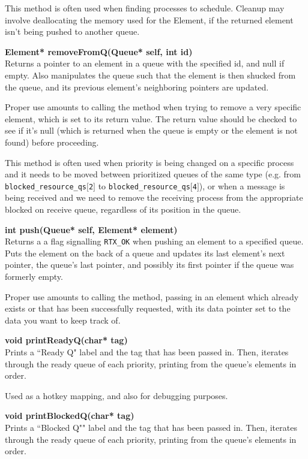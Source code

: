 \documentclass[11pt, oneside]{article}
\begin{document}
This method is often used when finding processes to schedule. Cleanup may involve deallocating the memory used for the Element, if the returned element isn't being pushed to another queue.

{\bf Element* removeFromQ(Queue* self, int id)}\\
Returns a pointer to an element in a queue with the specified id, and null if empty. Also manipulates the queue such that the element is then shucked from the queue, and its previous element's neighboring pointers are updated.

Proper use amounts to calling the method when trying to remove a very specific element, which is set to its return value. The return value should be checked to see if it's null (which is returned when the queue is empty or the element is not found) before proceeding.

This method is often used when priority is being changed on a specific process and it needs to be moved between prioritized queues of the same type (e.g. from {\tt blocked\_resource\_qs$[$2$]$} to {\tt blocked\_resource\_qs$[$4$]$}), or when a message is being received and we need to remove the receiving process from the appropriate blocked on receive queue, regardless of its position in the queue.

{\bf int push(Queue* self, Element* element)}\\
Returns a a flag signalling {\tt RTX\_OK} when pushing an element to a specified queue. Puts the element on the back of a queue and updates its last element's next pointer, the queue's last pointer, and possibly its first pointer if the queue was formerly empty.

Proper use amounts to calling the method, passing in an element which already exists or that has been successfully requested, with its data pointer set to the data you want to keep track of.


{\bf void printReadyQ(char* tag)}\\
Prints a ``Ready Q" label and the tag that has been passed in. Then, iterates through the ready queue of each priority, printing from the queue's elements in order.

Used as a hotkey mapping, and also for debugging purposes.

{\bf void printBlockedQ(char* tag)}\\
Prints a ``Blocked Q"" label and the tag that has been passed in. Then, iterates through the ready queue of each priority, printing from the queue's elements in order.
\end{document}

